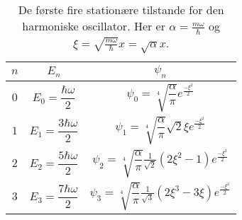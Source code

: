 \documentclass[../Kvantemekanik.tex]{subfiles}
\begin{document}
\begin{table}[h!]
\center
\begin{tabular}{|c c c|}
$n$&$E_n$&$\psi_n$\\\hline
$0$ & $E_0 = \dfrac{\hbar\omega}{2}$ & $\psi_0 = \sqrt[4]{\dfrac{\alpha}{\pi}}e^{\frac{-\xi^2}{2}}$\\
$1$ & $E_1 = \dfrac{3\hbar\omega}{2}$ & $\psi_1 = \sqrt[4]{\dfrac{\alpha}{\pi}}\sqrt{2}\xi e^{\frac{-\xi^2}{2}}$\\
$2$ & $E_2 = \dfrac{5\hbar\omega}{2}$ & $\psi_2 = \sqrt[4]{\dfrac{\alpha}{\pi}}\frac{1}{\sqrt{2}} (2\xi^2-1) e^{\frac{-\xi^2}{2}}$\\
$3$ & $E_3 = \dfrac{7\hbar\omega}{2}$ & $\psi_3 = \sqrt[4]{\dfrac{\alpha}{\pi}}\frac{1}{\sqrt{3}} (2\xi^3-3\xi) e^{\frac{-\xi^2}{2}}$\\\hline
\end{tabular}
\caption{De første fire stationære tilstande for den harmoniske oscillator. Her er $\alpha = \frac{m\omega}{\hbar}$ og $\xi = \sqrt{\frac{m\omega}{\hbar}}x = \sqrt{\alpha}x$.}
\end{table}
\end{document}
